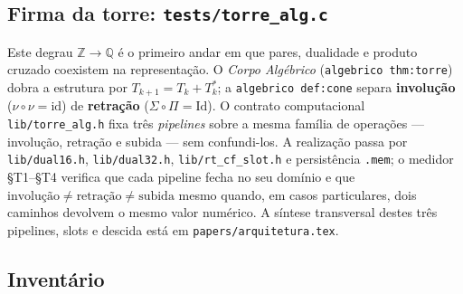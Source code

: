\documentclass[11pt,a4paper]{article}
\newcommand{\code}[1]{\texttt{\small #1}}
\begin{document}
\subsection*{Firma da torre: \code{tests/torre\_alg.c}}

\noindent Este degrau $\mathbb{Z}\to\mathbb{Q}$ é o primeiro andar em que pares,
dualidade e produto cruzado coexistem na representação. O \emph{Corpo Algébrico}
(\code{algebrico thm:torre}) dobra a estrutura por
$T_{k+1}=T_k+T_k^{*}$; a \code{algebrico def:cone} separa
\textbf{involução} ($\nu\circ\nu=\mathrm{id}$) de \textbf{retração}
($\Sigma\circ\Pi=\mathrm{Id}$). O contrato computacional
\code{lib/torre\_alg.h} fixa três \emph{pipelines} sobre a mesma família de
operações --- involução, retração e subida --- sem confundi-los. A realização
passa por \code{lib/dual16.h}, \code{lib/dual32.h},
\code{lib/rt\_cf\_slot.h} e persistência \code{.mem}; o medidor §T1--§T4 verifica
que cada pipeline fecha no seu domínio e que
$\text{involução}\neq\text{retração}\neq\text{subida}$ mesmo quando, em casos
particulares, dois caminhos devolvem o mesmo valor numérico.
A síntese transversal destes três pipelines, slots e descida está em
\code{papers/arquitetura.tex}.

\subsection*{Inventário}
\end{document}
